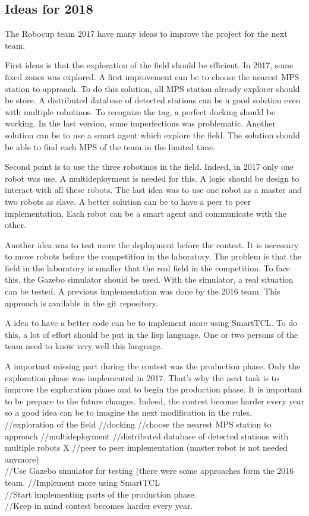 \subsection{Ideas for 2018}

The Robocup team 2017 have many ideas to improve the project for the next team. 

First ideas is that the exploration of the field should be efficient. In 2017, some fixed zones was explored. A first improvement can be to choose the nearest MPS station to approach. To do this solution, all MPS station already explorer should be store. A distributed database of detected stations can be a good solution even with multiple robotinos. To recognize the tag, a perfect docking should be working. In the last version, some imperfections was problematic. Another solution can be to use a smart agent which explore the field. The solution should be able to find each MPS of the team in the limited time.

Second point is to use the three robotinos in the field. Indeed, in 2017 only one robot was use. A multideployment is needed for this. A logic should be design to interact with all these robots. The last idea was to use one robot as a master and two robots as slave. A better solution can be to have a peer to peer implementation. Each robot can be a smart agent and communicate with the other.

Another idea was to test more the deployment before the contest. It is necessary to move robots before the competition in the laboratory. The problem is that the field in the laboratory is smaller that the real field in the competition. To face this, the Gazebo simulator should be used. With the simulator, a real situation can be tested. A previous implementation was done by the 2016 team. This approach is available in the git repository.

A idea to have a better code can be to implement more using SmartTCL. To do this, a lot of effort should be put in the lisp language. One or two persons of the team need to know very well this language. 

A important missing part during the contest was the production phase. Only the exploration phase was implemented in 2017. That's why the next task is to improve the exploration phase and to begin the production phase. It is important to be prepare to the future changes. Indeed, the contest become harder every year so a good idea can be to imagine the next modification in the rules. \\



//exploration of the field
//docking 
//choose the nearest MPS station to approach
//multideployment
//distributed database of detected stations with multiple robots X
//peer to peer implementation (master robot is not needed anymore) \\

//Use Gazebo simulator for testing (there were some approaches form the 2016 team. 
//Implement more using SmartTCL \\

//Start implementing parts of the production phase. \\

//Keep in mind contest becomes harder every year. 